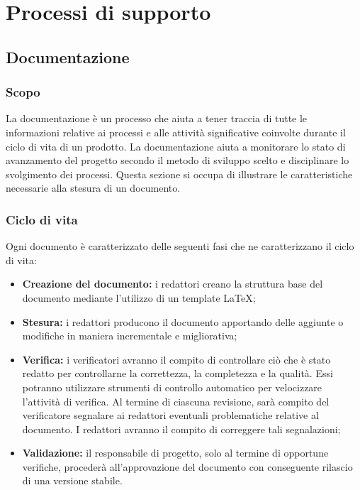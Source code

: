 \section{Processi di supporto}
  \subsection{Documentazione}

  \subsubsection{Scopo}
  La documentazione è un processo che aiuta a tener traccia di tutte le informazioni relative ai processi e alle attività significative coinvolte durante il ciclo di vita di un prodotto. La documentazione aiuta a monitorare lo stato di avanzamento del progetto secondo il metodo di sviluppo scelto e disciplinare lo svolgimento dei processi. Questa sezione si occupa di illustrare le caratteristiche necessarie alla stesura di un documento. 

  \subsubsection{Ciclo di vita}
  Ogni documento è caratterizzato delle seguenti fasi che ne caratterizzano il ciclo di vita:
	\begin{itemize}
		\item \textbf{Creazione del documento:} i redattori creano la struttura base del documento mediante l'utilizzo di un template \LaTeX;
		\item \textbf{Stesura:} i redattori producono il documento apportando delle aggiunte o modifiche in maniera incrementale e migliorativa;
		\item \textbf{Verifica:} i verificatori avranno il compito di controllare ciò che è stato redatto per controllarne la correttezza, la completezza e la qualità. Essi potranno utilizzare strumenti di controllo automatico per velocizzare l'attività di verifica. Al termine di ciascuna revisione, sarà compito del verificatore segnalare ai redattori eventuali problematiche relative al documento. I redattori avranno il compito di correggere tali segnalazioni;
		\item \textbf{Validazione:} il responsabile di progetto, solo al termine di opportune verifiche, procederà all'approvazione del documento con conseguente rilascio di una versione stabile.
	\end{itemize}

